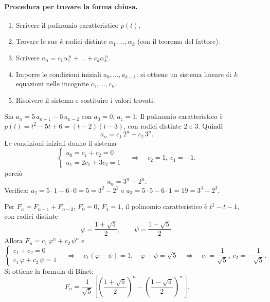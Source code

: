 \documentclass[11pt,a4paper]{article}
\begin{document}
\paragraph{Procedura per trovare la forma chiusa.}
\begin{enumerate}
  \item Scrivere il polinomio caratteristico $p(t)$.
  \item Trovare le sue $k$ radici distinte $\alpha_1, \dots, \alpha_k$
        (con il teorema del fattore).
  \item Scrivere $a_n = c_1 \alpha_1^{\,n} + \dots + c_k \alpha_k^{\,n}$.
  \item Imporre le condizioni iniziali $a_0, \dots, a_{k-1}$: si ottiene un
        sistema lineare di $k$ equazioni nelle incognite $c_1, \dots, c_k$.
  \item Risolvere il sistema e sostituire i valori trovati.
\end{enumerate}

\begin{esempio}
Sia $a_n = 5\, a_{n-1} - 6\, a_{n-2}$ con $a_0 = 0$, $a_1 = 1$. Il polinomio
caratteristico è $p(t) = t^2 - 5t + 6 = (t - 2)(t - 3)$, con radici distinte
$2$ e $3$. Quindi
\[
  a_n = c_1\, 2^n + c_2\, 3^n .
\]
Le condizioni iniziali danno il sistema
\[
  \begin{cases}
    a_0 = c_1 + c_2 = 0 \\
    a_1 = 2c_1 + 3c_2 = 1
  \end{cases}
  \quad\Longrightarrow\quad c_2 = 1,\ c_1 = -1 ,
\]
perciò
\[
  a_n = 3^n - 2^n .
\]
Verifica: $a_2 = 5 \cdot 1 - 6 \cdot 0 = 5 = 3^2 - 2^2$ e
$a_3 = 5 \cdot 5 - 6 \cdot 1 = 19 = 3^3 - 2^3$.
\end{esempio}

\begin{esempio}[Fibonacci]
Per $F_n = F_{n-1} + F_{n-2}$, $F_0 = 0$, $F_1 = 1$, il polinomio
caratteristico è $t^2 - t - 1$, con radici distinte
\[
  \varphi = \frac{1 + \sqrt{5}}{2} , \qquad \psi = \frac{1 - \sqrt{5}}{2} .
\]
Allora $F_n = c_1\, \varphi^n + c_2\, \psi^n$ e
\[
  \begin{cases}
    c_1 + c_2 = 0 \\
    c_1\, \varphi + c_2\, \psi = 1
  \end{cases}
  \quad\Longrightarrow\quad
  c_1 (\varphi - \psi) = 1 ,\quad \varphi - \psi = \sqrt{5}
  \quad\Longrightarrow\quad c_1 = \frac{1}{\sqrt{5}},\ c_2 = -\frac{1}{\sqrt{5}} .
\]
Si ottiene la formula di Binet:
\[
  F_n = \frac{1}{\sqrt{5}}\left[\left(\frac{1 + \sqrt{5}}{2}\right)^{n}
        - \left(\frac{1 - \sqrt{5}}{2}\right)^{n}\right] .
\]
\end{esempio}
\end{document}
